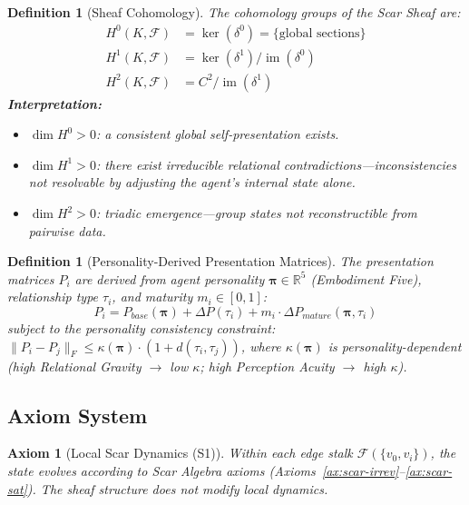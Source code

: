 \documentclass[11pt]{article}
\newtheorem{definition}[theorem]{Definition}
\newtheorem{axiom}{Axiom}[section]
\begin{document}
\begin{definition}[Sheaf Cohomology]
\label{def:sheaf-cohomology}
The cohomology groups of the Scar Sheaf are:
\begin{align}
H^0(K, \mathcal{F}) &= \ker(\delta^0) = \{\text{global sections}\} \\
H^1(K, \mathcal{F}) &= \ker(\delta^1) / \operatorname{im}(\delta^0) \\
H^2(K, \mathcal{F}) &= C^2 / \operatorname{im}(\delta^1)
\end{align}
\textbf{Interpretation:}
\begin{itemize}
\item $\dim H^0 > 0$: a consistent global self-presentation exists.
\item $\dim H^1 > 0$: there exist \emph{irreducible relational contradictions}---inconsistencies not resolvable by adjusting the agent's internal state alone.
\item $\dim H^2 > 0$: \emph{triadic emergence}---group states not reconstructible from pairwise data.
\end{itemize}
\end{definition}

\begin{definition}[Personality-Derived Presentation Matrices]
\label{def:presentation-matrices}
The presentation matrices $P_i$ are derived from agent personality $\boldsymbol{\pi} \in \mathbb{R}^5$ (Embodiment Five), relationship type $\tau_i$, and maturity $m_i \in [0,1]$:
\begin{equation}
P_i = P_{base}(\boldsymbol{\pi}) + \Delta P(\tau_i) + m_i \cdot \Delta P_{mature}(\boldsymbol{\pi}, \tau_i)
\end{equation}
subject to the personality consistency constraint: $\|P_i - P_j\|_F \leq \kappa(\boldsymbol{\pi}) \cdot (1 + d(\tau_i, \tau_j))$, where $\kappa(\boldsymbol{\pi})$ is personality-dependent (high Relational Gravity $\to$ low $\kappa$; high Perception Acuity $\to$ high $\kappa$).
\end{definition}

\subsection{Axiom System}

\begin{axiom}[Local Scar Dynamics (S1)]
\label{ax:sheaf-local}
Within each edge stalk $\mathcal{F}(\{v_0, v_i\})$, the state evolves according to Scar Algebra axioms (Axioms~\ref{ax:scar-irrev}--\ref{ax:scar-sat}). The sheaf structure does not modify local dynamics.
\end{axiom}
\end{document}
